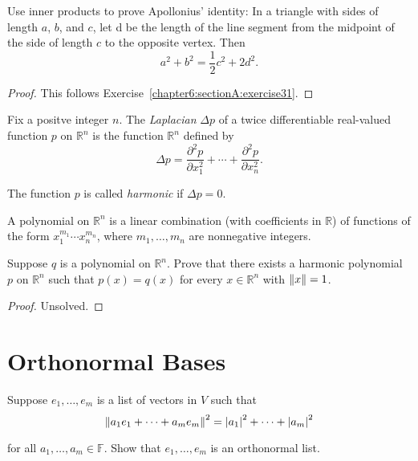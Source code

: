 \begin{exercise}
    Use inner products to prove Apollonius' identity: In a triangle with sides of
    length $a$, $b$, and $c$, let d be the length of the line segment from the midpoint of the side of length $c$ to the opposite vertex. Then
    \[
        a^{2} + b^{2} = \frac{1}{2}c^{2} + 2d^{2}.
    \]
\end{exercise}

\begin{proof}
    This follows Exercise~\ref{chapter6:sectionA:exercise31}.
\end{proof}
\newpage

\begin{exercise}
    Fix a positve integer $n$. The \textit{Laplacian} $\Delta p$ of a twice differentiable real-valued function $p$ on $\mathbb{R}^{n}$ is the function $\mathbb{R}^{n}$ defined by
    \[
        \Delta p = \frac{\partial^{2}p}{\partial x_{1}^{2}} + \cdots + \frac{\partial^{2}p}{\partial x_{n}^{2}}.
    \]

    The function $p$ is called \textit{harmonic} if $\Delta p = 0$.

    A polynomial on $\mathbb{R}^{n}$ is a linear combination (with coefficients in $\mathbb{R}$) of functions of the form $x_{1}^{m_{1}}\cdots x_{n}^{m_{n}}$, where $m_{1}, \ldots, m_{n}$ are nonnegative integers.

    Suppose $q$ is a polynomial on $\mathbb{R}^{n}$. Prove that there exists a harmonic polynomial $p$ on $\mathbb{R}^{n}$ such that $p(x) = q(x)$ for every $x \in \mathbb{R}^{n}$ with $\left\Vert{x}\right\Vert = 1$.
\end{exercise}

\begin{proof}
    Unsolved.
\end{proof}
\newpage

\section{Orthonormal Bases}

\begin{exercise}
    Suppose $e_{1}, \ldots, e_{m}$ is a list of vectors in $V$ such that
    \[
        \left\Vert{a_{1}e_{1} + \cdots + a_{m}e_{m}}\right\Vert^{2} = \left\vert{a_{1}}\right\vert^{2} + \cdots + \left\vert{a_{m}}\right\vert^{2}
    \]

    for all $a_{1}, \ldots, a_{m}\in \mathbb{F}$. Show that $e_{1}, \ldots, e_{m}$ is an orthonormal list.
\end{exercise}

